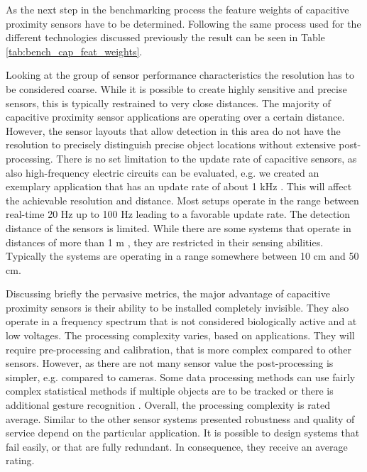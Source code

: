 As the next step in the benchmarking process the feature weights of capacitive proximity sensors have to be determined. Following the same process used for the different technologies discussed previously the result can be seen in Table \ref{tab:bench_cap_feat_weights}.

Looking at the group of sensor performance characteristics the resolution has to be considered coarse. While it is possible to create highly sensitive and precise sensors, this is typically restrained to very close distances. The majority of capacitive proximity sensor applications are operating over a certain distance. However, the sensor layouts that allow detection in this area do not have the resolution to precisely distinguish precise object locations without extensive post-processing. There is no set limitation to the update rate of capacitive sensors, as also high-frequency electric circuits can be evaluated, e.g. we created an exemplary application that has an update rate of about 1 kHz \cite{grosse2013opencapsense}. This will affect the achievable resolution and distance. Most setups operate in the range between real-time 20 Hz up to 100 Hz leading to a favorable update rate. The detection distance of the sensors is limited. While there are some systems that operate in distances of more than 1 m \cite{MacLachlan2004}, they are restricted in their sensing abilities. Typically the systems are operating in a range somewhere between 10 cm and 50 cm. 

Discussing briefly the pervasive metrics, the major advantage of capacitive proximity sensors is their ability to be installed completely invisible. They also operate in a frequency spectrum that is not considered biologically active and at low voltages. The processing complexity varies, based on applications. They will require pre-processing and calibration, that is more complex compared to other sensors. However, as there are not many sensor value the post-processing is simpler, e.g. compared to cameras. Some data processing methods can use fairly complex statistical methods if multiple objects are to be tracked or there is additional gesture recognition \cite{grosse2013swiss}. Overall, the processing complexity is rated average. Similar to the other sensor systems presented robustness and quality of service depend on the particular application. It is possible to design systems that fail easily, or that are fully redundant. In consequence, they receive an average rating. 

